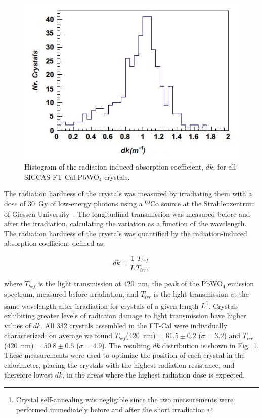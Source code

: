 \begin{figure}[th!]
\centering 
\includegraphics[width=0.85\columnwidth]{./fig/dk.jpeg} 
\caption{Histogram of the radiation-induced absorption coefficient, $dk$, for all SICCAS FT-Cal PbWO$_4$ crystals.}
\label{fig:dk} 
\end{figure}

The radiation hardness of the crystals was measured by irradiating them with a dose of 30~Gy of low-energy photons
using a $^{60}$Co source at the Strahlenzentrum of Giessen University~\cite{radhard}. The longitudinal transmission
was measured before and after the irradiation, calculating the variation as a function of the wavelength. The radiation
hardness of the crystals was quantified by the radiation-induced absorption coefficient defined as:

\begin{equation}
dk = \frac{1}{L}\frac{T_{bef}}{T_{irr},}
\end{equation}

\noindent
where $T_{bef}$ is the light transmission at 420~nm, the peak of the PbWO$_4$ emission spectrum, measured before
irradiation, and $T_{irr}$ is the light transmission at the same wavelength after irradiation for crystals of a given
length $L$\footnote{Crystal self-annealing was negligible since the two measurements were performed immediately
  before and after the short irradiation. }. Crystals exhibiting greater levels of radiation damage to light transmission
have higher values of $dk$. All 332 crystals assembled in the FT-Cal were individually characterized: on average we
found $T_{bef}$(420~nm) = $61.5 \pm 0.2$ ($\sigma=3.2$) and $T_{irr}$(420~nm) = $50.8 \pm 0.5$ ($\sigma=4.9$). 
The resulting $dk$ distribution is shown in Fig.~\ref{fig:dk}. These measurements were used to optimize the position
of each crystal in the calorimeter, placing the crystals with the highest radiation resistance, and therefore lowest
$dk$, in the areas where the highest radiation dose is expected.

